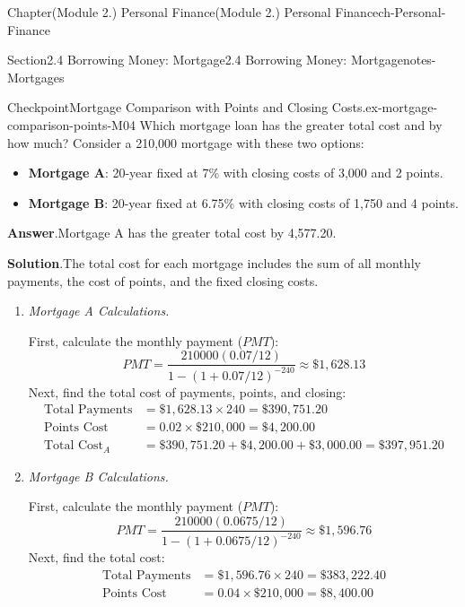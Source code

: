 \documentclass[oneside,10pt,]{book}
\newcommand{\blocktitlefont}{\relax}
\newcommand{\ptxlistdisc}{\raisebox{0.3ex}{\textbullet}}
\newcommand{\terminology}[1]{\textbf{#1}}
\newcommand{\lititle}[1]{{\slshape#1}}
\newcommand{\amp}{&}
\begin{document}
\begin{chapterptx}{Chapter}{(Module 2.) Personal Finance}{}{(Module 2.) Personal Finance}{}{}{ch-Personal-Finance}
\begin{sectionptx}{Section}{2.4 Borrowing Money: Mortgage}{}{2.4 Borrowing Money: Mortgage}{}{}{notes-Mortgages}
\begin{inlineexercise}{Checkpoint}{Mortgage Comparison with Points and Closing Costs.}{ex-mortgage-comparison-points-M04}
Which mortgage loan has the greater total cost and by how much? Consider a \textdollar{}210,000 mortgage with these two options:%
%
\begin{itemize}[label=\ptxlistdisc]
\item{}\terminology{Mortgage A}: 20-year fixed at 7\% with closing costs of \textdollar{}3,000 and 2 points.%
\item{}\terminology{Mortgage B}: 20-year fixed at 6.75\% with closing costs of \textdollar{}1,750 and 4 points.%
\end{itemize}
\par\smallskip%
\noindent\textbf{\blocktitlefont Answer}.\hypertarget{ex-mortgage-comparison-points-M04-3}{}\quad{}Mortgage A has the greater total cost by \textdollar{}4,577.20.%
\par\smallskip%
\noindent\textbf{\blocktitlefont Solution}.\hypertarget{ex-mortgage-comparison-points-M04-4}{}\quad{}The total cost for each mortgage includes the sum of all monthly payments, the cost of points, and the fixed closing costs.%
%
\begin{enumerate}
\item{}\lititle{Mortgage A Calculations.}\par%
First, calculate the monthly payment (\(PMT\)):%
\begin{equation*}
PMT = \frac{210000(0.07/12)}{1-(1+0.07/12)^{-240}} \approx \$1,628.13
\end{equation*}
Next, find the total cost of payments, points, and closing:%
\begin{align*}
\text{Total Payments} \amp = \$1,628.13 \times 240 = \$390,751.20\\
\text{Points Cost} \amp = 0.02 \times \$210,000 = \$4,200.00\\
\text{Total Cost}_A \amp = \$390,751.20 + \$4,200.00 + \$3,000.00 = \$397,951.20
\end{align*}
%
\item{}\lititle{Mortgage B Calculations.}\par%
First, calculate the monthly payment (\(PMT\)):%
\begin{equation*}
PMT = \frac{210000(0.0675/12)}{1-(1+0.0675/12)^{-240}} \approx \$1,596.76
\end{equation*}
Next, find the total cost:%
\begin{align*}
\text{Total Payments} \amp = \$1,596.76 \times 240 = \$383,222.40\\
\text{Points Cost} \amp = 0.04 \times \$210,000 = \$8,400.00\\

\end{align*}
\end{enumerate}
\end{inlineexercise}
\end{sectionptx}
\end{chapterptx}
\end{document}
